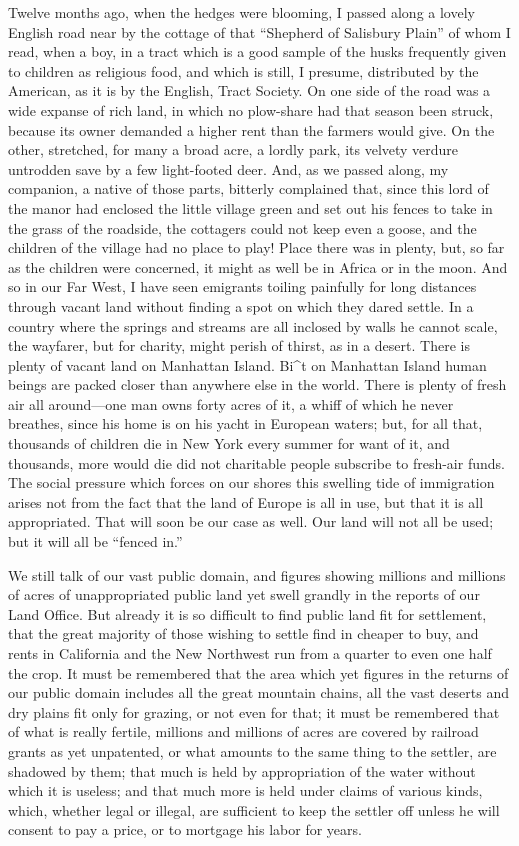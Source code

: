 \documentclass{book}
\begin{document}
Twelve months ago, when the hedges were blooming, I passed along a lovely English road near by the cottage of that “Shepherd of Salisbury Plain” of whom I read, when a boy, in a tract which is a good sample of the husks frequently given to children as religious food, and which is still, I presume, distributed by the American, as it is by the English, Tract Society. On one side of the road was a wide expanse of rich land, in which no plow-share had that season been struck, because its owner demanded a higher rent than the farmers would give. On the other, stretched, for many a broad acre, a lordly park, its velvety verdure untrodden save by a few light-footed deer. And, as we passed along, my companion, a native of those parts, bitterly complained that, since this lord of the manor had enclosed the little village green and set out his fences to take in the grass of the roadside, the cottagers could not keep even a goose, and the children of the village had no place to play! Place there was in plenty, but, so far as the children were concerned, it might as well be in Africa or in the moon. And so in our Far West, I have seen emigrants toiling painfully for long distances through vacant land without finding a spot on which they dared settle. In a country where the springs and streams are all inclosed by walls he cannot scale, the wayfarer, but for charity, might perish of thirst, as in a desert. There is plenty of vacant land on Manhattan Island. Bi\textasciicircum{}t on Manhattan Island human beings are packed closer than anywhere else in the world. There is plenty of fresh air all around—one man owns forty acres of it, a whiff of which he never breathes, since his home is on his yacht in European waters; but, for all that, thousands of children die in New York every summer for want of it, and thousands, more would die did not charitable people subscribe to fresh-air funds. The social pressure which forces on our shores this swelling tide of immigration arises not from the fact that the land of Europe is all in use, but that it is all appropriated. That will soon be our case as well. Our land will not all be used; but it will all be “fenced in.”

We still talk of our vast public domain, and figures showing millions and millions of acres of unappropriated public land yet swell grandly in the reports of our Land Office. But already it is so difficult to find public land fit for settlement, that the great majority of those wishing to settle find in cheaper to buy, and rents in California and the New Northwest run from a quarter to even one half the crop. It must be remembered that the area which yet figures in the returns of our public domain includes all the great mountain chains, all the vast deserts and dry plains fit only for grazing, or not even for that; it must be remembered that of what is really fertile, millions and millions of acres are covered by railroad grants as yet unpatented, or what amounts to the same thing to the settler, are shadowed by them; that much is held by appropriation of the water without which it is useless; and that much more is held under claims of various kinds, which, whether legal or illegal, are sufficient to keep the settler off unless he will consent to pay a price, or to mortgage his labor for years.
\end{document}

